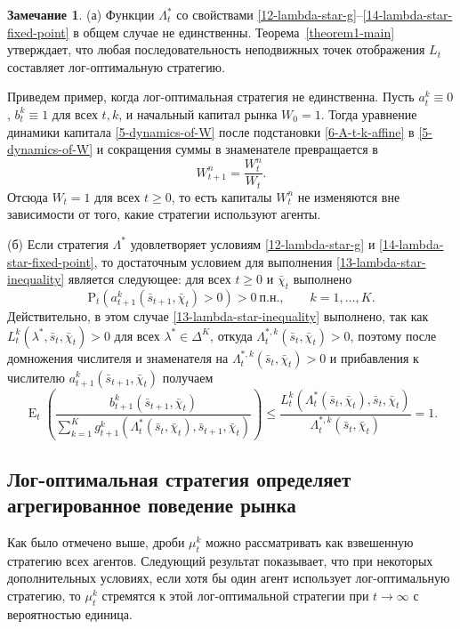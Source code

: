 \documentclass[a4paper,12pt,russian]{article} %
\theoremstyle{definition}
\newtheorem{remark}{Замечание}
\DeclareMathOperator{\E}{E}
\renewcommand{\P}{\mathrm{P}}
\begin{document}
\begin{remark}
(а) Функции $\Lambda^*_t$ со свойствами \eqref{12-lambda-star-g}--\eqref{14-lambda-star-fixed-point} в общем случае не единственны.
Теорема~\ref{theorem1-main} утверждает, что любая последовательность неподвижных точек отображения $L_t$ составляет лог-оптимальную стратегию. 

Приведем пример, когда лог-оптимальная стратегия не единственна.
Пусть $a_{t}^k \equiv 0$, $b_{t}^k\equiv 1$ для всех $t,k$, и начальный капитал рынка $W_0=1$.
Тогда уравнение динамики капитала \eqref{5-dynamics-of-W} после подстановки \eqref{6-A-t-k-affine} в \eqref{5-dynamics-of-W} и сокращения суммы в знаменателе превращается в 
\[
W_{t+1}^n = \frac{W_t^n}{W_t}.
\]
Отсюда $W_t=1$ для всех $t\ge 0$, то есть капиталы $W_t^n$ не изменяются вне зависимости от того, какие стратегии используют агенты.

(б) Если стратегия $\Lambda^*$ удовлетворяет условиям \eqref{12-lambda-star-g} и  \eqref{14-lambda-star-fixed-point}, то достаточным условием для выполнения \eqref{13-lambda-star-inequality} является следующее: для всех $t\ge0$ и $\bar\chi_t$ выполнено
\[
\P_t(a_{t+1}^k(\bar s_{t+1},\bar\chi_t) > 0) > 0\ \text{п.н.}, \qquad k=1,\dots,K.
\]
Действительно, в этом случае \eqref{13-lambda-star-inequality} выполнено, так как $L_{t}^k (\lambda^*,\bar s_t,\bar \chi_t)>0$ для всех $\lambda^* \in\Delta^K$, откуда $\Lambda_{t}^{*,k}(\bar s_t,\bar\chi_t)>0$, поэтому после домножения числителя и знаменателя на $\Lambda_{t}^{*,k}(\bar s_t,\bar\chi_t)>0$ и прибавления к числителю ${a_{t+1}^k(\bar s_{t+1},\bar\chi_t)}$ получаем
\[
\E_t \left(
  \frac{b_{t+1}^k(\bar s_{t+1},\bar \chi_t)}
       {\sum_{k=1}^K g_{t+1}^k(\Lambda_t^*(\bar s_t,\bar\chi_t),\bar s_{t+1},\bar\chi_t)}
\right)
\le \frac{L_{t}^k(\Lambda_{t}^*(\bar s_t, \bar \chi_t), \bar s_t, \bar \chi_t)}
         {\Lambda_{t}^{*,k} (\bar s_t, \bar \chi_t)}
= 1.
\]
\end{remark}




\subsection{Лог-оптимальная стратегия определяет агрегированное поведение рынка}
\label{section-3-3-aggregate-market-behaviour}
Как было отмечено выше, дроби $\mu_{t}^k$ можно рассматривать как взвешенную стратегию всех агентов.
Следующий результат показывает, что при некоторых дополнительных условиях, если хотя бы один агент использует лог-оптимальную стратегию, то $\mu_{t}^k$ стремятся к этой лог-оптимальной стратегии при $t\to\infty$ с вероятностью единица.
\end{document}
